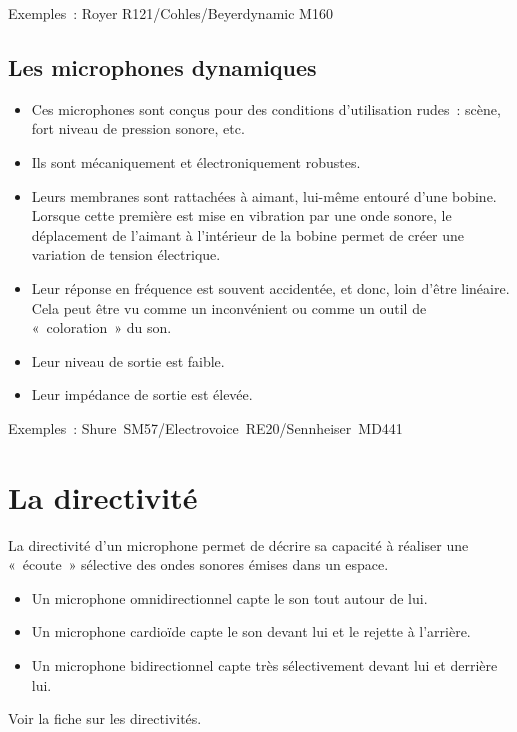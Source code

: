 \documentclass[
]{book}
\providecommand{\tightlist}{%
  \setlength{\itemsep}{0pt}\setlength{\parskip}{0pt}}
\begin{document}
Exemples~: Royer R121/Cohles/Beyerdynamic M160

\hypertarget{les-microphones-dynamiques}{%
\subsection{Les microphones dynamiques}\label{les-microphones-dynamiques}}

\begin{itemize}
\tightlist
\item
  Ces microphones sont conçus pour des conditions d'utilisation rudes~: scène, fort niveau de pression sonore, etc.
\item
  Ils sont mécaniquement et électroniquement robustes.
\item
  Leurs membranes sont rattachées à aimant, lui-même entouré d'une bobine. Lorsque cette première est mise en vibration par une onde sonore, le déplacement de l'aimant à l'intérieur de la bobine permet de créer une variation de tension électrique.
\item
  Leur réponse en fréquence est souvent accidentée, et donc, loin d'être linéaire. Cela peut être vu comme un inconvénient ou comme un outil de «~coloration~» du son.
\item
  Leur niveau de sortie est faible.
\item
  Leur impédance de sortie est élevée.
\end{itemize}

Exemples~: Shure~SM57/Electrovoice~RE20/Sennheiser~MD441

\hypertarget{la-directivituxe9}{%
\section{La directivité}\label{la-directivituxe9}}

La directivité d'un microphone permet de décrire sa capacité à réaliser une «~écoute~» sélective des ondes sonores émises dans un espace.

\begin{itemize}
\tightlist
\item
  Un microphone omnidirectionnel capte le son tout autour de lui.
\item
  Un microphone cardioïde capte le son devant lui et le rejette à l'arrière.
\item
  Un microphone bidirectionnel capte très sélectivement devant lui et derrière lui.
\end{itemize}

Voir la fiche sur les directivités.
\end{document}

